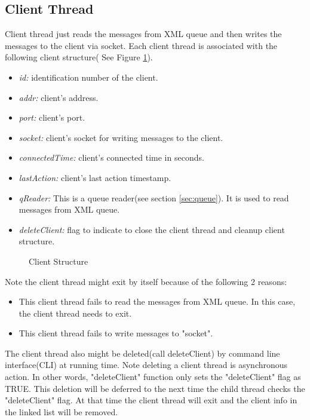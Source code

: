 \begin{itemize}
\subsection{Client Thread}
Client thread just reads the messages from XML queue and then writes the messages to the client via socket. Each client thread is associated with the following client structure( See Figure \ref{fig:clientsctrl:struct:node}).
\begin{itemize}
	\item{\emph{id:} identification number of the client. }
	\item{\emph{addr:} client's address. }
	\item{\emph{port:} client's port. }
	\item{\emph{socket:} client's socket for writing messages to the client.}
	\item{\emph{connectedTime:} client's connected time in seconds. }
	\item{\emph{lastAction:} client's last action timestamp. }
	\item{\emph{qReader:} This is a queue reader(see section \ref{sec:queue}). It is used to read messages from XML queue.}
	\item{\emph{deleteClient:} flag to indicate to close the client thread and cleanup client structure.  }
\end{itemize}	
 \begin{figure}
\centering
{}
\caption{ Client Structure }
\label{fig:clientsctrl:struct:node}
\end{figure}
\end{itemize}
Note the client thread might exit by itself because of the following 2 reasons:
\begin{itemize}
	\item{ This client thread fails to read the messages from XML queue. In this case, the client thread needs to exit. }
	\item{  This client thread fails to write messages to "socket".}
\end{itemize}
The client thread also might be deleted(call deleteClient) by command line interface(CLI) at running time. Note deleting a client thread is asynchronous action. In other words,  "deleteClient" function only sets the "deleteClient" flag as TRUE. This deletion will be deferred to the next time the child thread checks the "deleteClient" flag. At that time the client thread will exit and the client info in the linked list will be removed. 


